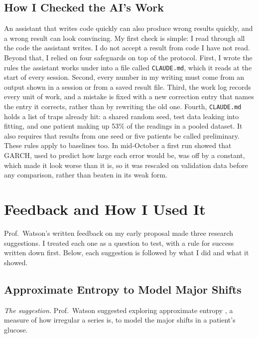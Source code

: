 \subsection{How I Checked the AI's Work}

An assistant that writes code quickly can also produce wrong results quickly, and a wrong result can look convincing. My first check is simple: I read through all the code the assistant writes. I do not accept a result from code I have not read. Beyond that, I relied on four safeguards on top of the protocol. First, I wrote the rules the assistant works under into a file called \texttt{CLAUDE.md}, which it reads at the start of every session. Second, every number in my writing must come from an output shown in a session or from a saved result file. Third, the work log records every unit of work, and a mistake is fixed with a new correction entry that names the entry it corrects, rather than by rewriting the old one. Fourth, \texttt{CLAUDE.md} holds a list of traps already hit: a shared random seed, test data leaking into fitting, and one patient making up 53\% of the readings in a pooled dataset. It also requires that results from one seed or five patients be called preliminary. These rules apply to baselines too. In mid-October a first run showed that GARCH, used to predict how large each error would be, was off by a constant, which made it look worse than it is, so it was rescaled on validation data before any comparison, rather than beaten in its weak form. 

\section{Feedback and How I Used It}

Prof.\ Watson's written feedback on my early proposal made three research suggestions. I treated each one as a question to test, with a rule for success written down first. Below, each suggestion is followed by what I did and what it showed.

\subsection{Approximate Entropy to Model Major Shifts}

\textit{The suggestion.} Prof.\ Watson suggested exploring approximate entropy \parencite{pincus1991apen}, a measure of how irregular a series is, to model the major shifts in a patient's glucose.

